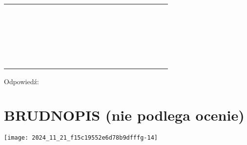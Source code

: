 \documentclass[10pt]{article}
\begin{document}
\begin{center}
\begin{tabular}{|c|c|c|c|c|c|c|c|c|c|c|c|c|c|c|c|c|c|c|c|c|}
\hline
 &  &  &  &  &  &  &  &  &  &  &  &  &  &  &  &  &  &  &  &  \\
\hline
 &  &  &  &  &  &  &  &  &  &  &  &  &  &  &  &  &  &  &  &  \\
\hline
 &  &  &  &  &  &  &  &  &  &  &  &  &  &  &  &  &  &  &  &  \\
\hline
 &  &  &  &  &  &  &  &  &  &  &  &  &  &  &  &  &  &  &  &  \\
\hline
 &  &  &  &  &  &  &  &  &  &  &  &  &  &  &  &  &  &  &  &  \\
\hline
 &  &  &  &  &  &  &  &  &  &  &  &  &  &  &  &  &  &  &  &  \\
\hline
 &  &  &  &  &  &  &  &  &  &  &  &  &  &  &  &  &  &  &  &  \\
\hline
 &  &  &  &  &  &  &  &  &  &  &  &  &  &  &  &  &  &  &  &  \\
\hline
 &  &  &  &  &  &  &  &  &  &  &  &  &  &  &  &  &  &  &  &  \\
\hline
 &  &  &  &  &  &  &  &  &  &  &  &  &  &  &  &  &  &  &  &  \\
\hline
 &  &  &  &  &  &  &  &  &  &  &  &  &  &  &  &  &  &  &  &  \\
\hline
 &  &  &  &  &  &  &  &  &  &  &  &  &  &  &  &  &  &  &  &  \\
\hline
 &  &  &  &  &  &  &  &  &  &  &  &  &  &  &  &  &  &  &  &  \\
\hline
 &  &  &  &  &  &  &  &  &  &  &  &  &  &  &  &  &  &  &  &  \\
\hline
 &  &  &  &  &  &  &  &  &  &  &  &  &  &  &  &  &  &  &  &  \\
\hline
 &  &  &  &  &  &  &  &  &  &  &  &  &  &  &  &  &  &  &  &  \\
\hline
 &  &  &  &  &  &  &  &  &  &  &  &  &  &  &  &  &  &  &  &  \\
\hline
 &  &  &  &  &  &  &  &  &  &  &  &  &  &  &  &  &  &  &  &  \\
\hline
 &  &  &  &  &  &  &  &  &  &  &  &  &  &  &  &  &  &  &  &  \\
\hline
 &  &  &  &  &  &  &  &  &  &  &  &  &  &  &  &  &  &  &  &  \\
\hline
 &  &  &  &  &  &  &  &  &  &  &  &  &  &  &  &  &  &  &  &  \\
\hline
 &  &  &  &  &  &  &  &  &  &  &  &  &  &  &  &  &  &  &  &  \\
\hline
 &  &  &  &  &  &  &  &  &  &  &  &  &  &  &  &  &  &  &  &  \\
\hline
\end{tabular}
\end{center}

Odpowiedź:

\section*{BRUDNOPIS (nie podlega ocenie)}
\begin{center}
\texttt{[image: 2024\_11\_21\_f15c19552e6d78b9dfffg-14]}
\end{center}
\end{document}
